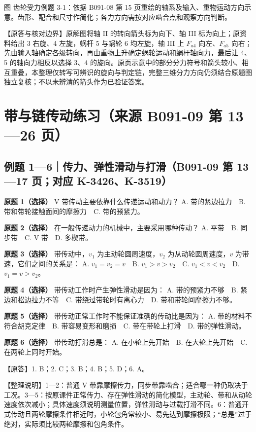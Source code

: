 \documentclass[zihao=5,a4paper,UTF8,fontset=fandol]{ctexart}
\begin{document}
图 齿轮受力例题 3-1：依据 B091-08 第 15 页重绘的轴系及输入、重物运动方向示意。齿形、配合和尺寸作简化；各力方向需按对应啮合点和观察方向判断。


【原答与核对边界】原解图将轴 II 的转向箭头标为向下、轴 III 标为向上；原资料给出 3 右旋、4 左旋，蜗杆 5 与蜗轮 6 均左旋，轴 III 上 $F_{a4}$ 向左、$F_{a5}$ 向右；先由输入轴确定各级转向，再由重物上升确定蜗轮运动和蜗杆轴向力，最后让 4、5 的轴向力相反以选择 3、4 的旋向。原页示意中的部分分力符号和箭头较小、相互重叠，本整理仅转写可辨识的旋向与判定链，完整三维分力方向仍须结合原题图独立复核；不以未辨清的箭头作为已验证答案。




\section{带与链传动练习（来源 B091-09 第 13—26 页）}

\subsection{例题 1—6｜传力、弹性滑动与打滑（B091-09 第 13—17 页；对应 K-3426、K-3519）}

\textbf{原题 1（选择）} V 带传动主要依靠什么传递运动和动力？
A. 带的紧边拉力　B. 带和带轮接触面间的摩擦力　C. 带的预紧力。


\textbf{原题 2（选择）} 在一般传递动力的机械中，主要采用哪种传动？
A. 平带　B. 同步带　C. V 带　D. 多楔带。


\textbf{原题 3（选择）} 带传动中，$v_1$ 为主动轮圆周速度，$v_2$ 为从动轮圆周速度，$v$ 为带速，它们之间的关系是：
A. $v_1=v_2=v$　B. $v_1>v>v_2$　C. $v_1<v<v_2$　D. $v_1=v>v_2$。


\textbf{原题 4（选择）} 带传动工作时产生弹性滑动是因为：
A. 带的预紧力不够　B. 紧边和松边拉力不等　C. 带绕过带轮时有离心力　D. 带和带轮间摩擦力不够。


\textbf{原题 5（选择）} 带传动正常工作时不能保证准确的传动比是因为：
A. 带的材料不符合胡克定律　B. 带容易变形和磨损　C. 带在带轮上打滑　D. 带的弹性滑动。


\textbf{原题 6（选择）} 带传动打滑总是：
A. 在小轮上先开始　B. 在大轮上先开始　C. 在两轮上同时开始。


【原答】1. B；2. C；3. B；4. B；5. D；6. A。


【整理说明】1—2：普通 V 带靠摩擦传力，同步带靠啮合；适合哪一种仍取决于工况。3—5：按原课件正常传力、存在弹性滑动的简化模型，主动轮、带和从动轮速度依次减小；具体速度须说明测量位置，弹性滑动与过载打滑不同。6：普通开式传动且两轮摩擦条件相近时，小轮包角常较小、易先达到摩擦极限；“总是”过于绝对，实际须比较两轮摩擦和包角条件。
\end{document}
